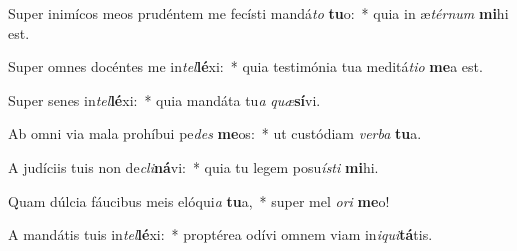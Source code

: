 \item Super inimícos meos prudéntem me fecísti mandá\textit{to} \textbf{tu}o:~* quia in æ\textit{tér}\textit{num} \textbf{mi}hi est.
\item Super omnes docéntes me in\textit{tel}\textbf{lé}xi:~* quia testimónia tua meditá\textit{ti}\textit{o} \textbf{me}a est.
\item Super senes in\textit{tel}\textbf{lé}xi:~* quia mandáta tu\textit{a} \textit{quæ}\textbf{sí}vi.
\item Ab omni via mala prohíbui pe\textit{des} \textbf{me}os:~* ut custódiam \textit{ver}\textit{ba} \textbf{tu}a.
\item A judíciis tuis non de\textit{cli}\textbf{ná}vi:~* quia tu legem posu\textit{ís}\textit{ti} \textbf{mi}hi.
\item Quam dúlcia fáucibus meis elóqui\textit{a} \textbf{tu}a,~* super mel \textit{o}\textit{ri} \textbf{me}o!
\item A mandátis tuis in\textit{tel}\textbf{lé}xi:~* proptérea odívi omnem viam in\textit{i}\textit{qui}\textbf{tá}tis.
